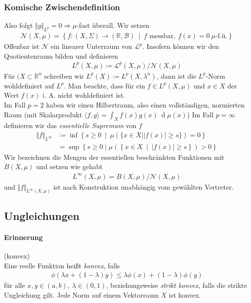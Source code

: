 \documentclass[12pt,a4paper,fleqn]{article}
\def\set#1{{\left\{ #1 \right\}}}
\def\Mid{\ \middle|\ }
\def\d{{\operatorname{d}}}
\begin{document}
\subsubsection*{Komische Zwischendefinition} 
Also folgt $\Vert g \Vert_{L^p} = 0 \Rightarrow \mu$-fast überall. Wir setzen
\begin{align*}
\mathcal{N}(X, \mu) = \set{f\colon (X, \Sigma) \rightarrow (\mathbb{R}, \mathcal{B}) \Mid f \text{ messbar},\ f(x) = 0\ \mu\text{-f.ü.}}
\end{align*}
Offenbar ist $\mathcal{N}$ ein linearer Unterraum von $\mathscr{L}^p$. Insofern können wir den Quotientenraum bilden und definieren
\begin{align*}
L^p(X, \mu) \coloneqq \mathscr{L}^p(X, \mu)/\mathcal{N}(X, \mu)
\end{align*}
Für $(X \subset \mathbb{R}^n$ schreiben wir $L^p(X) \coloneqq L^p(X, \lambda^n)$, dann ist die $L^p$-Norm wohldefiniert auf $L^p$.
Man beachte, dass für ein $f \in L^p(X, \mu)$ und $ x\in X$ der Wert $f(x)$ i. A. nicht wohldefiniert ist.\\
Im Fall $p = 2$ haben wir einen Hilbertraum, also einen vollständigen, normierten Raum (mit Skalarprodukt $\langle f, g\rangle = \int_X f(x)g(x)\ \d\mu(x)$)
Im Fall $ p = \infty$ definieren wir das \textit{essentielle Supremum} von $f$
\begin{align*}
\Vert f \Vert_{L^\infty} &\coloneqq \inf \set{s \geq 0 \Mid \mu(\{x \in X \mid \vert f(x)\vert \geq s\})=0}\\
&= \sup \set{s\geq 0 \mid \mu(\set{x \in X \Mid \vert f(x) \vert \geq s }) > 0 } 
\end{align*}
Wir bezeichnen die Mengen der essentiellen beschränkten Funktionen mit $B(X, \mu)$ und setzen wie gehabt 
\begin{align*}
L^\infty(X, \mu) = B(X, \mu)/\mathcal{N}(X, \mu)
\end{align*}
und $\Vert f \Vert_{L^\infty (X, \mu)}$ ist nach Konstruktion unabhängig vom gewählten Vertreter.

\subsection{Ungleichungen}

\paragraph{Erinnerung} (konvex)\\
Eine reelle Funktion heißt \textit{konvex}, falls
\begin{align*}
\phi(\lambda x + (1 - \lambda) y ) \leq \lambda \phi (x) + (1 - \lambda) \phi(y)
\end{align*}
für alle $x, y \in (a, b),\ \lambda \in (0,1)$, beziehungsweise \textit{strikt konvex}, falls die strikte Ungleichung gilt. Jede Norm auf einem Vektorraum $X$ ist konvex.
\end{document}
